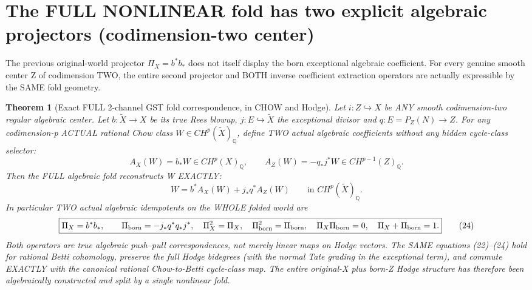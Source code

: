 \documentclass[11pt]{article}
\newtheorem{theorem}{Theorem}[section]
\begin{document}
\section{The FULL NONLINEAR fold has two explicit algebraic projectors (codimension-two center)}
The previous original-world projector
$\Pi_X=b^*b_*$ does not itself display
the born exceptional algebraic coefficient.
For every genuine smooth center Z of codimension TWO,
the entire second projector and BOTH inverse
coefficient extraction operators are actually
expressible by the SAME fold geometry.

\begin{theorem}[Exact FULL 2-channel GST fold correspondence, in CHOW and Hodge]
Let $i:Z\hookrightarrow X$ be ANY smooth
codimension-two regular algebraic center.
Let $b:\widetilde X\to X$ be its true Rees
blowup, $j:E\hookrightarrow\widetilde X$
the exceptional divisor and $q:E=P_Z(N)\to Z$.
For any codimension-p ACTUAL rational Chow class
$W\in CH^p(\widetilde X)_\mathbb Q$, define
TWO actual algebraic coefficients without any
hidden cycle-class selector:
\[
 \boxed{
  A_X(W)=b_*W\in CH^p(X)_\mathbb Q,\qquad
  A_Z(W)=-q_*j^*W\in CH^{p-1}(Z)_\mathbb Q.
 }                                                     \tag{22}
\]
Then the FULL algebraic fold reconstructs W EXACTLY:
\[
 \boxed{
 W=b^*A_X(W)+j_*q^*A_Z(W)
 \qquad\text{in }CH^p(\widetilde X)_\mathbb Q.
 }                                                     \tag{23}
\]
In particular TWO actual algebraic idempotents on
the WHOLE folded world are
\[
 \boxed{
 \Pi_X=b^*b_*,
 \qquad
 \Pi_{\rm born}=-j_*q^*q_*j^*,
 \quad
 \Pi_X^2=\Pi_X,\quad
 \Pi_{\rm born}^2=\Pi_{\rm born},\quad
 \Pi_X\Pi_{\rm born}=0,\quad
 \Pi_X+\Pi_{\rm born}=1.
 }                                                     \tag{24}
\]
Both operators are true algebraic push--pull
correspondences, not merely linear maps on Hodge vectors.
The SAME equations (22)--(24) hold for rational
Betti cohomology, preserve the full Hodge bidegrees
(with the normal Tate grading in the exceptional term),
and commute EXACTLY with the canonical rational
Chow-to-Betti cycle-class map.
The entire original-X plus born-Z Hodge
structure has therefore been algebraically
constructed and split by a single nonlinear fold.
\end{theorem}
\end{document}
